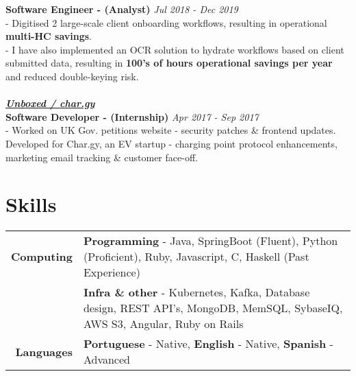 \documentclass[a4paper,10pt]{article}
\begin{document}
		\textbf{Software Engineer - (Analyst)}  \hfill \textit{Jul 2018 - Dec 2019}
		\\ - Digitised 2 large-scale client onboarding workflows, resulting in operational \textbf{multi-HC savings}. 
		\\ - I have also implemented an OCR solution to hydrate workflows based on client submitted data, resulting in \textbf{100's of hours operational savings per year} and reduced double-keying risk.
		\\\\\hfill\textbf{\textit{\underline{Unboxed / char.gy}}}
		\\\textbf{Software Developer - (Internship)} \hfill \textit{Apr 2017 - Sep 2017 }
		\\ - Worked on UK Gov. petitions website - security patches \& frontend updates. Developed for Char.gy, an EV startup - charging point protocol enhancements, marketing email tracking \& customer face-off.
	
		

	

	
		\section*{Skills}
	
	\begin{tabular}{r|p{12cm}}	
		\textbf{Computing}	 & \textbf{Programming} - Java, SpringBoot (Fluent), Python (Proficient), Ruby, Javascript, C, Haskell (Past Experience) \\&
								\textbf{Infra \& other} - Kubernetes, Kafka, Database design, REST API's, MongoDB, MemSQL, SybaseIQ, AWS S3, Angular, Ruby on Rails  \\
		\textbf{Languages}   & \textbf{Portuguese} - Native, \textbf{English} - Native, \textbf{Spanish} - Advanced
	\end{tabular}
	
	\thispagestyle{empty}

	
	
\end{document}

